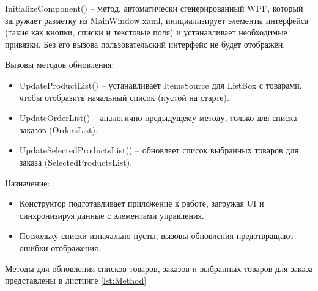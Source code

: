 \documentclass[12pt]{article}
\newcommand{\colorGIT}[1]{\textcolor{CtpLavender}{#1}}
\renewcommand{\texttt}[1]{{\small\ttfamily #1}}
\newenvironment{code}
  {\par\captionsetup{type=listing}\noindent}
  {\par\vspace{\baselineskip}}
\numberwithin{listing}{section}
\numberwithin{figure}{section}
\begin{document}
\begin{code}
	\inputminted[firstline=24, lastline=30]{csharp}{../3lab/StoreManager/MainWindow.xaml.cs}
	\caption{Пример кода для конструктора класса \colorGIT{\href{https://github.com/WebMasterIT/Csharp_Labs/blob/ec375afd16c0647b337cf3d8a79c8bef904fc1be/3lab/StoreManager/MainWindow.xaml.cs\#L24-L30}{MainWindow}}}
	\label{lst:Main2}
\end{code}

\texttt{InitializeComponent()} -- метод, автоматически сгенерированный \texttt{WPF}, который загружает разметку из \texttt{MainWindow.xaml}, инициализирует элементы интерфейса (такие как кнопки, списки и текстовые поля) и устанавливает необходимые привязки. Без его вызова пользовательский интерфейс не будет отображён.

\noindent Вызовы методов обновления:
\begin{itemize}
	\item \texttt{UpdateProductList()} -- устанавливает \texttt{ItemsSource} для \texttt{ListBox} с товарами, чтобы отобразить начальный список (пустой на старте).
	\item \texttt{UpdateOrderList()} -- аналогично предыдущему методу, только для списка заказов (\texttt{Or\-dersList}).
	\item \texttt{UpdateSelectedProductsList()} -- обновляет список выбранных товаров для заказа (\texttt{Sel\-ected\-ProductsList}).
\end{itemize}

\noindent Назначение:
\begin{itemize}
	\item Конструктор подготавливает приложение к работе, загружая \texttt{UI} и синхронизируя данные с элементами управления.
	\item Поскольку списки изначально пусты, вызовы обновления предотвращают ошибки отображения.
\end{itemize}

Методы для обновления списков товаров, заказов и выбранных товаров для заказа
представлены в листинге \ref{lst:Method}

\begin{code}
	\inputminted[firstline=32, lastline=51]{csharp}{../3lab/StoreManager/MainWindow.xaml.cs}
	\caption{\colorGIT{\href{https://github.com/WebMasterIT/Csharp_Labs/blob/ec375afd16c0647b337cf3d8a79c8bef904fc1be/3lab/StoreManager/MainWindow.xaml.cs\#L32-L51}{Методы}} обновления данных}
	\label{lst:Method}
\end{code}
\end{document}
